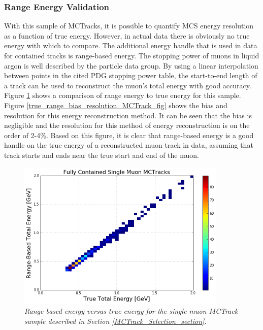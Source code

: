 \subsubsection{Range Energy Validation}\label{Range_Energy_Validation_section}
With this sample of {\sc MCTracks}, it is possible to quantify MCS energy resolution as a function of true energy. However, in actual {\ub} data there is obviously no true energy with which to compare. The additional energy handle that is used in data for contained tracks is range-based energy. The stopping power of muons in liquid argon is well described by the particle data group\cite{PDG_spline_table}. By using a linear interpolation between points in the cited PDG stopping power table, the start-to-end length of a track can be used to reconstruct the muon's total energy with good accuracy. Figure \ref{true_range_energy_MCTrack_fig} shows a comparison of range energy to true energy for this sample. Figure \ref{true_range_bias_resolution_MCTrack_fig} shows the bias and resolution for this energy reconstruction method. It can be seen that the bias is negligible and the resolution for this method of energy reconstruction is on the order of 2-4\%. Based on this figure, it is clear that range-based energy is a good handle on the true energy of a reconstructed muon track in {\ub} data, assuming that track starts and ends near the true start and end of the muon.

\begin{figure}[h!]
\begin{center}
\includegraphics[width=100mm]{Figures/true_range_comparison_MCTracks.png}
\end{center}
\caption{\textit{Range based energy versus true energy for the single muon {\sc MCTrack} sample described in Section \ref{MCTrack_Selection_section}.}}
\label{true_range_energy_MCTrack_fig}
\end{figure}



